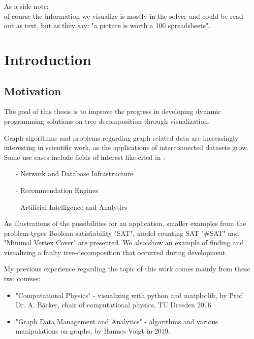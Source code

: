 \documentclass[a4paper, 12pt, bibliography=totoc]{scrartcl}
\begin{document}
As a side note: \\
of course the information we visualize is mostly in the solver and could be read out as text, but as they say: "a picture is worth a 100 spreadsheets".


{\setlength{\textheight}{1.02\textheight}\newpage
	
\tableofcontents
}

\newpage


\section{Introduction}
\subsection{Motivation}

The goal of this thesis is to improve the progress in developing dynamic programming solutions on tree decomposition through visualization.

Graph-algorithms and problems regarding graph-related data are increasingly interesting in scientific work, as the applications of interconnected datasets grow.
Some use cases include fields of interest like cited in \cite{graphUseCases}: %
\begin{itemize}
	\item[-] Network and Database Infrastructure
	\item[-] Recommendation Engines
	\item[-] Artificial Intelligence and Analytics
\end{itemize}

As illustrations of the possibilities for an application, smaller examples from the problem-types Boolean satisfiability "SAT", model counting SAT "\#SAT" and "Minimal Vertex Cover" are presented.
We also show an example of finding  and visualizing a faulty tree-decomposition that occurred during development.

My previous experience regarding the topic of this work comes mainly from these two courses:
\begin{itemize}
	\item "Computational Physics" - visualizing with python and matplotlib, by Prof. Dr. A. Bäcker,
	chair of computational physics, TU Dresden 2016
	\item "Graph Data Management and Analytics" - algorithms and various manipulations on graphs, by Hannes Voigt in 2019. \cite{VLGDMA}
\end{itemize}
\end{document}
